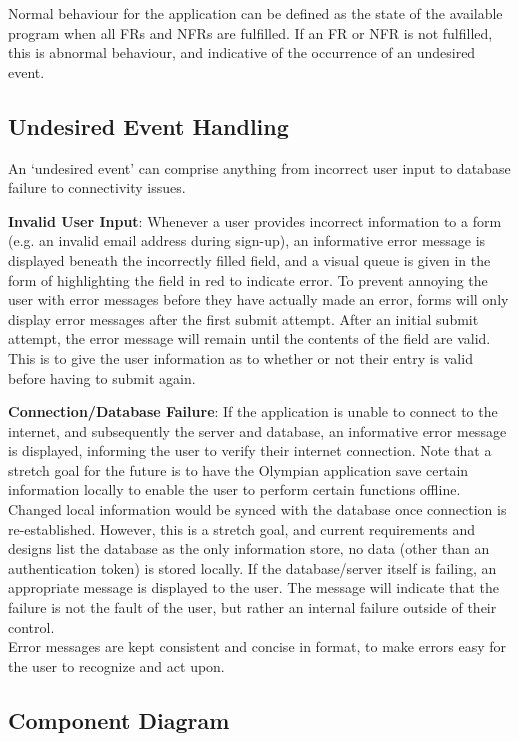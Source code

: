 \documentclass[12pt, titlepage]{article}
\begin{document}
	Normal behaviour for the application can be defined as the state of the available program when all FRs and NFRs are fulfilled. If an FR or NFR is not fulfilled, this is abnormal behaviour, and indicative of the occurrence of an undesired event.
	
	\subsection{Undesired Event Handling}
	
	An `undesired event' can comprise anything from incorrect user input to database failure to connectivity issues. 
	
	\textbf{Invalid User Input}: Whenever a user provides incorrect information to a form (e.g. an invalid email address during sign-up), an informative error message is displayed beneath the incorrectly filled field, and a visual queue is given in the form of highlighting the field in red to indicate error. To prevent annoying the user with error messages before they have actually made an error, forms will only display error messages after the first submit attempt. After an initial submit attempt, the error message will remain until the contents of the field are valid. This is to give the user information as to whether or not their entry is valid before having to submit again.
	
	\textbf{Connection/Database Failure}: If the application is unable to connect to the internet, and subsequently the server and database, an informative error message is displayed, informing the user to verify their internet connection. Note that a stretch goal for the future is to have the Olympian application save certain information locally to enable the user to perform certain functions offline. Changed local information would be synced with the database once connection is re-established. However, this is a stretch goal, and current requirements and designs list the database as the only information store, no data (other than an authentication token) is stored locally. If the database/server itself is failing, an appropriate message is displayed to the user. The message will indicate that the failure is not the fault of the user, but rather an internal failure outside of their control.
	\\
	
	Error messages are kept consistent and concise in format, to make errors easy for the user to recognize and act upon.
  
	\subsection{Component Diagram}
\end{document}

